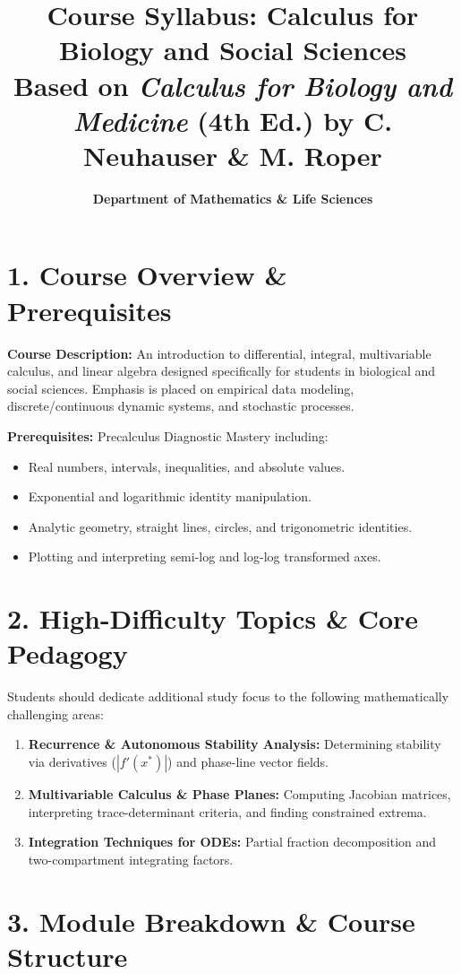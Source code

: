 \documentclass[10pt,letterpaper]{article}
\title{\textbf{Course Syllabus: Calculus for Biology and Social Sciences}\\
\large Based on \textit{Calculus for Biology and Medicine} (4th Ed.) by C. Neuhauser \& M. Roper}
\author{\textbf{Department of Mathematics \& Life Sciences}}
\date{}
\begin{document}
\maketitle

\section*{1. Course Overview \& Prerequisites}
\textbf{Course Description:} An introduction to differential, integral, multivariable calculus, and linear algebra designed specifically for students in biological and social sciences. Emphasis is placed on empirical data modeling, discrete/continuous dynamic systems, and stochastic processes.

\textbf{Prerequisites:} Precalculus Diagnostic Mastery including:
\begin{itemize}[noitemsep,topsep=0pt]
    \item Real numbers, intervals, inequalities, and absolute values.
    \item Exponential and logarithmic identity manipulation.
    \item Analytic geometry, straight lines, circles, and trigonometric identities.
    \item Plotting and interpreting semi-log and log-log transformed axes.
\end{itemize}

\section*{2. High-Difficulty Topics \& Core Pedagogy}
Students should dedicate additional study focus to the following mathematically challenging areas:
\begin{enumerate}[noitemsep,topsep=0pt]
    \item \textbf{Recurrence \& Autonomous Stability Analysis:} Determining stability via derivatives ($|f'(x^*)|$) and phase-line vector fields.
    \item \textbf{Multivariable Calculus \& Phase Planes:} Computing Jacobian matrices, interpreting trace-determinant criteria, and finding constrained extrema.
    \item \textbf{Integration Techniques for ODEs:} Partial fraction decomposition and two-compartment integrating factors.
\end{enumerate}

\section*{3. Module Breakdown \& Course Structure}
\end{document}
